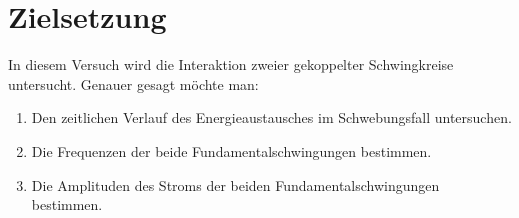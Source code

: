 \section{Zielsetzung}
\label{sec:Zielsetzung}

In diesem Versuch wird die Interaktion zweier gekoppelter Schwingkreise untersucht.
Genauer gesagt möchte man:
\begin{enumerate}[label=\alph*)]
    \item Den zeitlichen Verlauf des Energieaustausches im Schwebungsfall untersuchen.
    \item Die Frequenzen der beide Fundamentalschwingungen bestimmen.
    \item Die Amplituden des Stroms der beiden Fundamentalschwingungen bestimmen.
\end{enumerate}